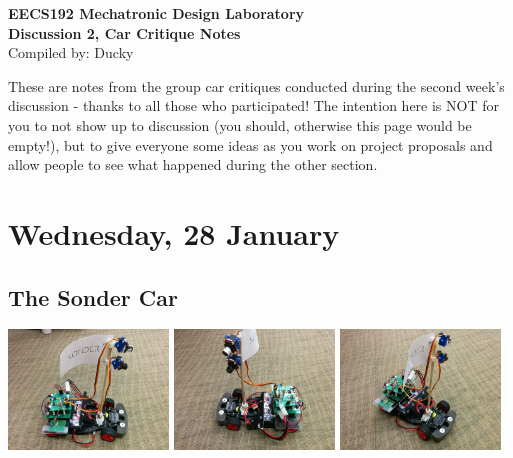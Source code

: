 \documentclass{article}
\begin{document}
{\centering \Large \bf EECS192 Mechatronic Design Laboratory \\}
{\centering \bf Discussion 2, Car Critique Notes \\}
{\centering Compiled by: Ducky \\}

These are notes from the group car critiques conducted during the second week's discussion - thanks to all those who participated! The intention here is NOT for you to not show up to discussion (you should, otherwise this page would be empty!), but to give everyone some ideas as you work on project proposals and allow people to see what happened during the other section.

\section{Wednesday, 28 January}
\subsection{The Sonder Car}
{\centering
\includegraphics[width=0.32\textwidth]{images-dis2-carcritiques/sonder-side1}
\includegraphics[width=0.32\textwidth]{images-dis2-carcritiques/sonder-side2}
\includegraphics[width=0.32\textwidth]{images-dis2-carcritiques/sonder-angle} \\}
\end{document}
